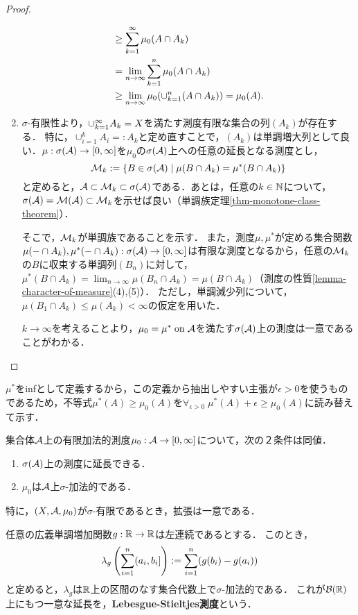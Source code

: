 \documentclass[uplatex, dvipdfmx]{jsreport}
\begin{document}
\begin{proof}
\begin{enumerate}
\begin{align*}
            &\ge\sum_{k=1}^\infty\mu_0(A\cap A_k)\\
            &=\lim_{n\to\infty}\sum_{k=1}^n\mu_0(A\cap A_k)\\
            &\ge\lim_{n\to\infty}\mu_0(\cup_{k=1}^n(A\cap A_k))=\mu_0(A).
        \end{align*}
        \item 
        $\sigma$-有限性より，$\cup_{k=1}^\infty A_k=X$を満たす測度有限な集合の列$(A_k)$が存在する．
        特に，$\cup_{i=1}^kA_i=:A_k$と定め直すことで，$(A_k)$は単調増大列として良い．$\mu:\sigma(\mathcal{A})\to[0,\infty]$を$\mu_0$の$\sigma(\mathcal{A})$上への任意の延長となる測度とし，\[\mathcal{M}_k:=\left\{B\in\sigma(\mathcal{A})\mid\mu(B\cap A_k)=\mu^*(B\cap A_k)\right\}\]と定めると，$\mathcal{A}\subset\mathcal{M}_k\subset\sigma(\mathcal{A})$である．あとは，任意の$k\in\mathbb{N}$について，$\sigma(\mathcal{A})=\mathcal{M}(\mathcal{A})\subset\mathcal{M}_k$を示せば良い（単調族定理\ref{thm-monotone-class-theorem}）．

        そこで，$\mathcal{M}_k$が単調族であることを示す．
        また，測度$\mu,\mu^*$が定める集合関数$\mu(-\cap A_k),\mu^*(-\cap A_k):\sigma(\mathcal{A})\to[0,\infty]$は有限な測度となるから，任意の$\mathcal{M}_k$の$B$に収束する単調列$(B_n)$に対して，$\mu^*(B\cap A_k)=\lim_{n\to\infty}\mu(B_n\cap A_k)=\mu(B\cap A_k)$（測度の性質\ref{lemma-character-of-measure}(4),(5)）．
        ただし，単調減少列について，$\mu(B_1\cap A_k)\le\mu(A_k)<\infty$の仮定を用いた．

        $k\to\infty$を考えることより，$\mu_0=\mu^*\;\mathrm{on}\;\mathcal{A}$を満たす$\sigma(\mathcal{A})$上の測度は一意であることがわかる．
    \end{enumerate}
\end{proof}
\begin{remarks}
    $\mu^*$をinfとして定義するから，この定義から抽出しやすい主張が$\epsilon>0$を使うものであるため，不等式$\mu^*(A)\ge\mu_0(A)$を$\forall_{\epsilon>0}\;\mu^*(A)+\epsilon\ge\mu_0(A)$に読み替えて示す．
\end{remarks}

\begin{theorem}
    集合体$\mathcal{A}$上の有限加法的測度$\mu_0:\mathcal{A}\to[0,\infty]$について，次の２条件は同値．
    \begin{enumerate}
        \item $\sigma(\mathcal{A})$上の測度に延長できる．
        \item $\mu_0$は$\mathcal{A}$上$\sigma$-加法的である．
    \end{enumerate}
    特に，$(X,\mathcal{A},\mu_0)$が$\sigma$-有限であるとき，拡張は一意である．
\end{theorem}

\begin{example}
    任意の広義単調増加関数$g:\mathbb{R}\to\mathbb{R}$は左連続であるとする．
    このとき，
    \[\lambda_g\left(\sum^n_{i=1}(a_i,b_i]\right):=\sum^n_{i=1}(g(b_i)-g(a_i))\]
    と定めると，$\lambda_g$は$\mathbb{R}$上の区間のなす集合代数上で$\sigma$-加法的である．
    これが$\mathcal{B}(\mathbb{R})$上にもつ一意な延長を，\textbf{Lebesgue-Stieltjes測度}という．
\end{example}
\end{document}
